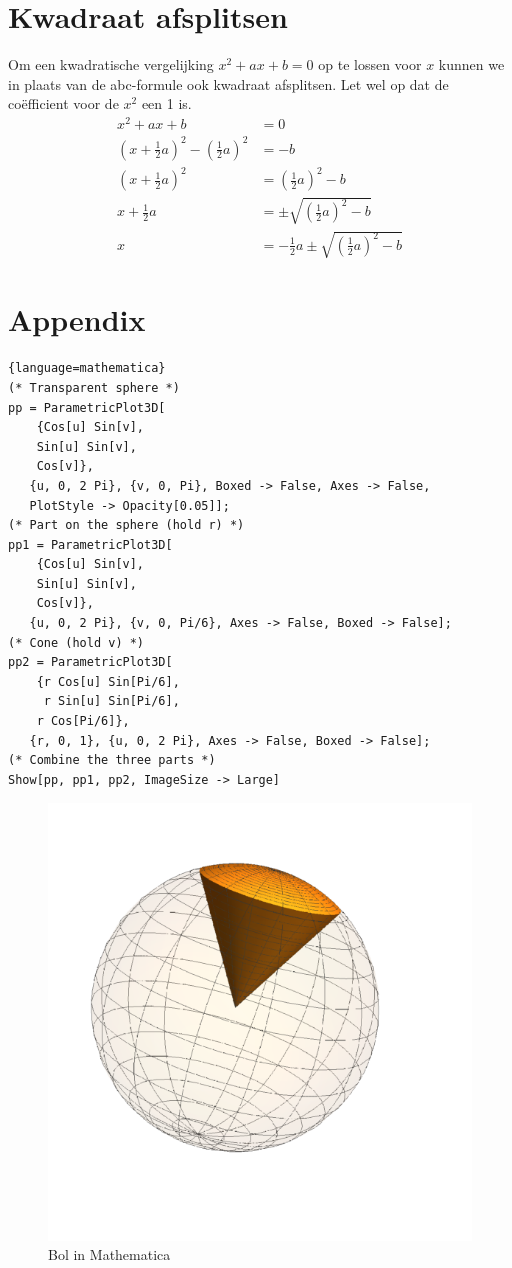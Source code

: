\documentclass{article}
\begin{document}
	\section{Kwadraat afsplitsen}
        Om een kwadratische vergelijking $x^2 + ax + b = 0$ op te lossen voor $x$ kunnen we in plaats van de abc-formule ook kwadraat afsplitsen. Let wel op dat de co\"efficient voor de $x^2$ een 1 is.
        \begin{align*}
            x^2 + a x + b &= 0 \\
            \left(x + \frac{1}{2} a\right)^2 - \left( \frac{1}{2}a \right)^2 &= - b \\
            \left(x + \frac{1}{2} a\right)^2 &= \left( \frac{1}{2}a \right)^2 - b \\
            x + \frac{1}{2} a &= \pm \sqrt{\left( \frac{1}{2}a \right)^2 - b} \\
            x &= -  \frac{1}{2} a \pm \sqrt{\left(\frac{1}{2}a \right)^2 - b}
        \end{align*}

    \newpage
    \section{Appendix}
    \begin{lstlisting}{language=mathematica}
(* Transparent sphere *)
pp = ParametricPlot3D[
    {Cos[u] Sin[v],
    Sin[u] Sin[v],
    Cos[v]},
   {u, 0, 2 Pi}, {v, 0, Pi}, Boxed -> False, Axes -> False,
   PlotStyle -> Opacity[0.05]];
(* Part on the sphere (hold r) *)
pp1 = ParametricPlot3D[
    {Cos[u] Sin[v],
    Sin[u] Sin[v],
    Cos[v]},
   {u, 0, 2 Pi}, {v, 0, Pi/6}, Axes -> False, Boxed -> False];
(* Cone (hold v) *)
pp2 = ParametricPlot3D[
    {r Cos[u] Sin[Pi/6],
     r Sin[u] Sin[Pi/6],
    r Cos[Pi/6]},
   {r, 0, 1}, {u, 0, 2 Pi}, Axes -> False, Boxed -> False];
(* Combine the three parts *)
Show[pp, pp1, pp2, ImageSize -> Large]
    \end{lstlisting}
    \begin{figure}[h!]
        \centering
        \includegraphics[width=.5\textwidth]{bolMMa.png}
    \caption{Bol in Mathematica}\label{bolMMa}
    \end{figure}
\end{document}
